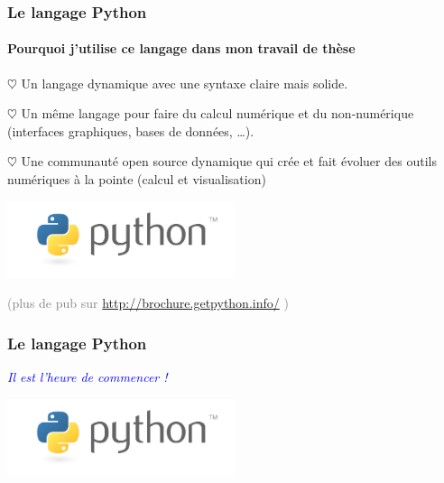 \documentclass[]{beamer}
\begin{document}
  
  \begin{frame}
    \frametitle{Le langage Python}
    \framesubtitle{Pourquoi j'utilise ce langage dans mon travail de thèse}
    
    $\heartsuit$ Un langage dynamique avec une syntaxe claire mais solide.
    
    \vspace{1em}
    
    $\heartsuit$ Un même langage pour faire du calcul numérique et du non-numérique
    (interfaces graphiques, bases de données, \dots).
    
    \vspace{1em}
    
    $\heartsuit$ Une communauté open source dynamique qui crée et fait évoluer des outils
    numériques à la pointe (calcul et visualisation)
    
    \vspace{1em}
    
    \begin{center}
     \includegraphics[width=0.5\textwidth]{python-logo.png}
    
     \textcolor{gray}{(plus de pub sur \url{http://brochure.getpython.info/} )}
    \end{center}

  \end{frame}
  
  \begin{frame}
    \frametitle{Le langage Python}
    
    \centering \Large
    
    \textcolor{blue}{ \emph{Il est l'heure de commencer !} }
    
    \vspace{2em}
    
    \includegraphics[width=0.5\textwidth]{python-logo.png}

    
  \end{frame}
  
\end{document}
